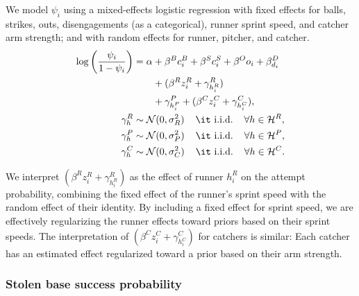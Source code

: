 \documentclass[opre,dblanonrev]{informs4}
\begin{document}
        We model $\psi_i$ using a mixed-effects logistic regression with fixed effects for balls, strikes, outs, disengagements (as a categorical), runner sprint speed, and catcher arm strength; and with random effects for runner, pitcher, and catcher.
        \begin{align}
          \label{eqn:prob-sb-attempt}
          \begin{split}
            \log\left(\frac{\psi_i}{1 - \psi_i}\right) &= \alpha + \beta^B c_i^B + \beta^S c_i^S +\beta^O o_i + \beta^D_{d_i}\\
            &\qquad +(\beta^R z_i^R + \gamma^R_{h_i^R})\\
            &\qquad +\gamma^P_{h_i^P} + (\beta^C z_i^C + \gamma^C_{h_i^C}),\\
            \gamma^R_{h} &\sim \mathcal{N}(0, \sigma^2_R) \hspace{4mm} \mbox{\it i.i.d.} \hspace{4mm} \forall h \in \mathcal{H}^R,\\
            \gamma^P_{h} &\sim \mathcal{N}(0, \sigma^2_P) \hspace{4mm} \mbox{\it i.i.d.} \hspace{4mm} \forall h \in \mathcal{H}^P,\\
            \gamma^C_{h} &\sim \mathcal{N}(0, \sigma^2_C) \hspace{4mm} \mbox{\it i.i.d.} \hspace{4mm} \forall h \in \mathcal{H}^C.
          \end{split}
        \end{align}
 
        We interpret $(\beta^R z_i^R + \gamma^R_{h_i^R})$ as the effect of runner $h_i^R$ on the attempt probability, combining the fixed effect of the runner's sprint speed with the random effect of their identity. By including a fixed effect for sprint speed, we are effectively regularizing the runner effects toward priors based on their sprint speeds. The interpretation of $(\beta^C z_i^C + \gamma^C_{h_i^C})$ for catchers is similar: Each catcher has an estimated effect regularized toward a prior based on their arm strength.
      
      \subsubsection{Stolen base success probability}
      \label{sec:prob-sb-success}
\end{document}
